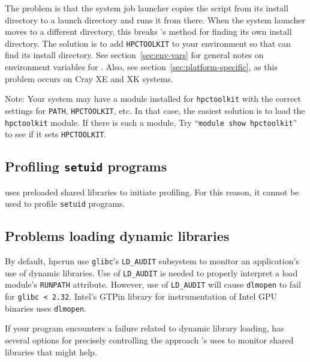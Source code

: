 \documentclass[11pt,twoside,letterpaper]{report}
\begin{document}
The problem is that the system job launcher copies the \hpcrun{}
script from its install directory to a launch directory and runs
it from there.  When the system launcher moves \hpcrun{} to a different directory, this
breaks \hpcrun{}'s method for finding its own install directory.
The solution is to add \verb|HPCTOOLKIT| to your environment so that
\hpcrun{} can find its install directory. See section~\ref{sec:env-vars} for
general notes on environment variables for \hpcrun{}. Also, see section~\ref{sec:platform-specific},
as this problem occurs on Cray XE and XK systems.

Note: Your system may have a module installed for \verb|hpctoolkit| with the
correct settings for \verb|PATH|, \verb|HPCTOOLKIT|, etc.  In that case,
the easiest solution is to load the \verb|hpctoolkit| module.  If there is
such a module, Try
``\verb|module show hpctoolkit|'' to see if it sets \verb|HPCTOOLKIT|.



\subsection{Profiling {\tt setuid} programs}

\hpcrun{} uses preloaded shared libraries to initiate profiling.  For this
reason, it cannot be used to profile {\tt setuid} programs.



\subsection{Problems loading dynamic libraries}

By default, hpcrun use {\tt glibc}'s {\tt LD\_AUDIT} subsystem to monitor an application's use of dynamic
  libraries. Use of  {\tt LD\_AUDIT}  is needed to properly interpret a load module's
  {\tt RUNPATH} attribute. However, use of {\tt LD\_AUDIT} will cause {\tt dlmopen} to fail
  for \verb|glibc < 2.32|. Intel's GTPin library for instrumentation of Intel GPU
  binaries uses {\tt dlmopen}.

If your program encounters a failure related to dynamic library loading,
\hpcrun{} has several options for precisely controlling the approach \hpcrun{}'s uses to monitor shared libraries that might help.
\end{document}
